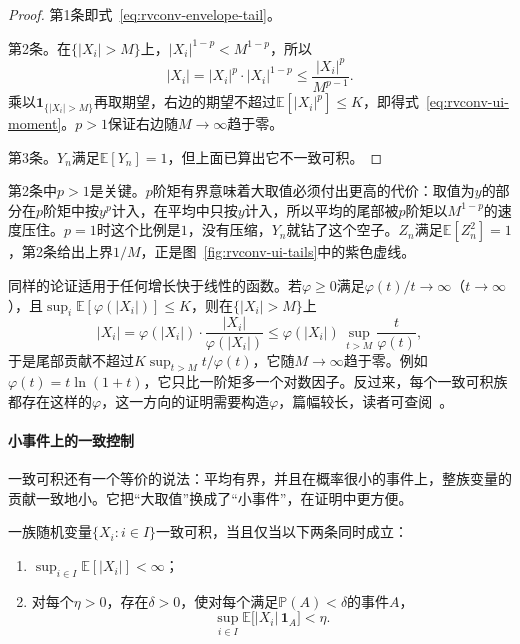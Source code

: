 \begin{proof}
第1条即式~\eqref{eq:rvconv-envelope-tail}。

第2条。在$\{\lvert X_i\rvert>M\}$上，$\lvert X_i\rvert^{1-p}<M^{1-p}$，所以
\[
 \lvert X_i\rvert=\lvert X_i\rvert^{p}\cdot\lvert X_i\rvert^{1-p}\leq\frac{\lvert X_i\rvert^{p}}{M^{p-1}} .
\]
乘以$\mathbf{1}_{\{\lvert X_i\rvert>M\}}$再取期望，右边的期望不超过$\mathbb{E}[\lvert X_i\rvert^{p}]\leq K$，即得式~\eqref{eq:rvconv-ui-moment}。$p>1$保证右边随$M\to\infty$趋于零。

第3条。$Y_n$满足$\mathbb{E}[Y_n]=1$，但上面已算出它不一致可积。
\end{proof}

第2条中$p>1$是关键。$p$阶矩有界意味着大取值必须付出更高的代价：取值为$y$的部分在$p$阶矩中按$y^{p}$计入，在平均中只按$y$计入，所以平均的尾部被$p$阶矩以$M^{1-p}$的速度压住。$p=1$时这个比例是$1$，没有压缩，$Y_n$就钻了这个空子。$Z_n$满足$\mathbb{E}[Z_n^{2}]=1$，第2条给出上界$1/M$，正是图~\ref{fig:rvconv-ui-tails}中的紫色虚线。

同样的论证适用于任何增长快于线性的函数。若$\varphi\geq0$满足$\varphi(t)/t\to\infty$（$t\to\infty$），且$\sup_i\mathbb{E}[\varphi(\lvert X_i\rvert)]\leq K$，则在$\{\lvert X_i\rvert>M\}$上
\[
 \lvert X_i\rvert=\varphi(\lvert X_i\rvert)\cdot\frac{\lvert X_i\rvert}{\varphi(\lvert X_i\rvert)}\leq\varphi(\lvert X_i\rvert)\,\sup_{t>M}\frac{t}{\varphi(t)} ,
\]
于是尾部贡献不超过$K\sup_{t>M}t/\varphi(t)$，它随$M\to\infty$趋于零。例如$\varphi(t)=t\ln(1+t)$，它只比一阶矩多一个对数因子。反过来，每个一致可积族都存在这样的$\varphi$，这一方向的证明需要构造$\varphi$，篇幅较长，读者可查阅~。

\paragraph{小事件上的一致控制}
一致可积还有一个等价的说法：平均有界，并且在概率很小的事件上，整族变量的贡献一致地小。它把“大取值”换成了“小事件”，在证明中更方便。

\begin{lemma}[一致可积的等价刻画]
\label{lem:rvconv-ui-small-sets}
一族随机变量$\{X_i:i\in I\}$一致可积，当且仅当以下两条同时成立：
\begin{enumerate}
 \item $\sup_{i\in I}\mathbb{E}[\lvert X_i\rvert]<\infty$；
 \item 对每个$\eta>0$，存在$\delta>0$，使对每个满足$\mathbb{P}(A)<\delta$的事件$A$，
 \begin{equation}
  \sup_{i\in I}\mathbb{E}\bigl[\lvert X_i\rvert\,\mathbf{1}_{A}\bigr]<\eta .
  \label{eq:rvconv-ui-small-sets}
 \end{equation}
\end{enumerate}
\end{lemma}

